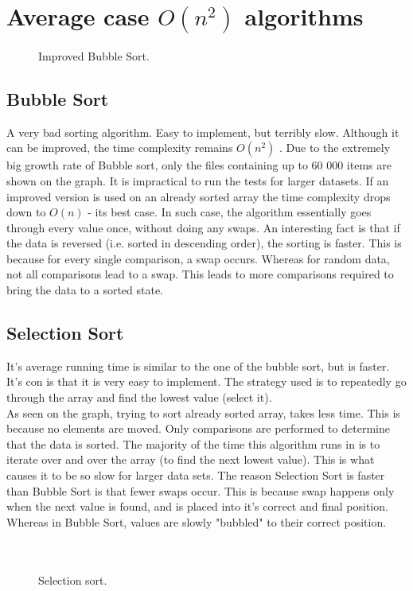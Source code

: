 \documentclass{acm_proc_article-sp}
\begin{document}
\section{Average case $O(n^2)$ algorithms}
\begin{figure}[!htb]
\centering
\caption{Improved Bubble Sort.}
\end{figure}
\subsection{Bubble Sort}
A very bad sorting algorithm. Easy to implement, but terribly slow. Although it can be improved, the time complexity remains $O(n^2)$ . Due to the extremely big growth rate of Bubble sort, only the files containing up to 60 000 items are shown on the graph. It is impractical to run the tests for larger datasets. If an improved version is used on an already sorted array the time complexity drops down to  $O(n)$ - its best case. In such case, the algorithm essentially goes through every value once, without doing any swaps. An interesting fact is that if the data is reversed (i.e. sorted in descending order), the sorting is faster. This is because for every single comparison, a swap occurs. Whereas for random data, not all comparisons lead to a swap. This leads to more comparisons required to bring the data to a sorted state.
\subsection{Selection Sort}
It's average running time is similar to the one of the bubble sort, but is faster. It's con is that it is very easy to implement. The strategy used is to repeatedly go through the array and find the lowest value (select it).\\
 As seen on the graph, trying to sort already sorted array, takes less time. This is because no elements are moved. Only comparisons are performed to determine that the data is sorted. The majority of the time this algorithm runs in is to iterate over and over the array (to find the next lowest value). This is what causes it to be so slow for larger data sets. The reason Selection Sort is faster than Bubble Sort is that fewer swaps occur. This is because swap happens only when the next value is found, and is placed into it's correct and final position. Whereas in Bubble Sort, values are slowly "bubbled" to their correct position. \\\\\\
\begin{figure}[!htb]
\caption{Selection sort.}
\end{figure}
\end{document}
